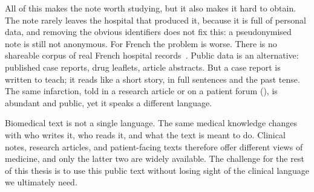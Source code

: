 All of this makes the note worth studying, but it also makes it hard to obtain. The
note rarely leaves the hospital that produced it, because it is full of personal
data, and removing the obvious identifiers does not fix this: a pseudonymised note
is still not anonymous. For French the problem is worse. There is no shareable
corpus of real French hospital records~\citep{neveol_clinical_2018}. Public data is
an alternative: published case reports, drug leaflets, article abstracts. But a
case report is written to teach; it reads like a short story, in full sentences and
the past tense. The same infarction, told in a research article or on a patient
forum (), is abundant and public, yet it speaks a different language.

\begin{center}
\label{fig:bt-web}
\end{center}
\medskip

Biomedical text is not a single language. The same medical knowledge changes with
who writes it, who reads it, and what the text is meant to do. Clinical notes,
research articles, and patient-facing texts therefore offer different views of
medicine, and only the latter two are widely available. The challenge for the rest
of this thesis is to use this public text without losing sight of the clinical
language we ultimately need.
